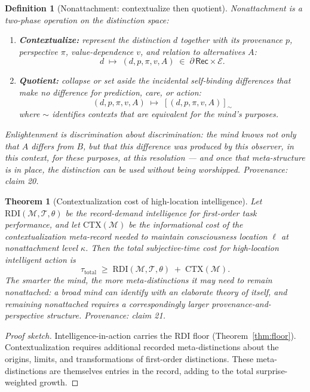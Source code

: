 \documentclass[11pt]{article}
\newtheorem{definition}{Definition}
\newtheorem{theorem}{Theorem}
\begin{document}
\begin{definition}[Nonattachment: contextualize then quotient]
\label{def:nonattach}
\emph{Nonattachment} is a two-phase operation on the distinction space:
\begin{enumerate}
  \item \textbf{Contextualize:} represent the distinction $d$ together with its provenance $p$, perspective $\pi$, value-dependence $v$, and relation to alternatives $A$:
  \[
    d \;\mapsto\; (d, p, \pi, v, A) \;\in\; \partial\,\mathsf{Rec} \times \mathcal{E}.
  \]
  \item \textbf{Quotient:} collapse or set aside the incidental self-binding differences that make no difference for prediction, care, or action:
  \[
    (d, p, \pi, v, A) \;\mapsto\; [(d, p, \pi, v, A)]_{\sim}
  \]
  where $\sim$ identifies contexts that are equivalent for the mind's purposes.
\end{enumerate}
Enlightenment is discrimination about discrimination: the mind knows not only that $A$ differs from $B$, but that this difference was produced by this observer, in this context, for these purposes, at this resolution --- and once that meta-structure is in place, the distinction can be used without being worshipped.
\emph{Provenance: claim 20.}
\end{definition}

\begin{theorem}[Contextualization cost of high-location intelligence]
\label{thm:contextcost}
Let $\mathrm{RDI}(\mathcal{M},\mathcal{T},\theta)$ be the record-demand intelligence for first-order task performance, and let $\mathrm{CTX}(\mathcal{M})$ be the informational cost of the contextualization meta-record needed to maintain consciousness location $\ell$ at nonattachment level $\kappa$. Then the total subjective-time cost for high-location intelligent action is
\[
  \tau_{\mathrm{total}} \;\geq\; \mathrm{RDI}(\mathcal{M},\mathcal{T},\theta) \;+\; \mathrm{CTX}(\mathcal{M}).
\]
The smarter the mind, the more meta-distinctions it may need to remain nonattached: a broad mind can identify with an elaborate theory of itself, and remaining nonattached requires a correspondingly larger provenance-and-perspective structure.
\emph{Provenance: claim 21.}
\end{theorem}
\begin{proof}[Proof sketch]
Intelligence-in-action carries the RDI floor (Theorem~\ref{thm:floor}). Contextualization requires additional recorded meta-distinctions about the origins, limits, and transformations of first-order distinctions. These meta-distinctions are themselves entries in the record, adding to the total surprise-weighted growth.
\end{proof}
\end{document}
